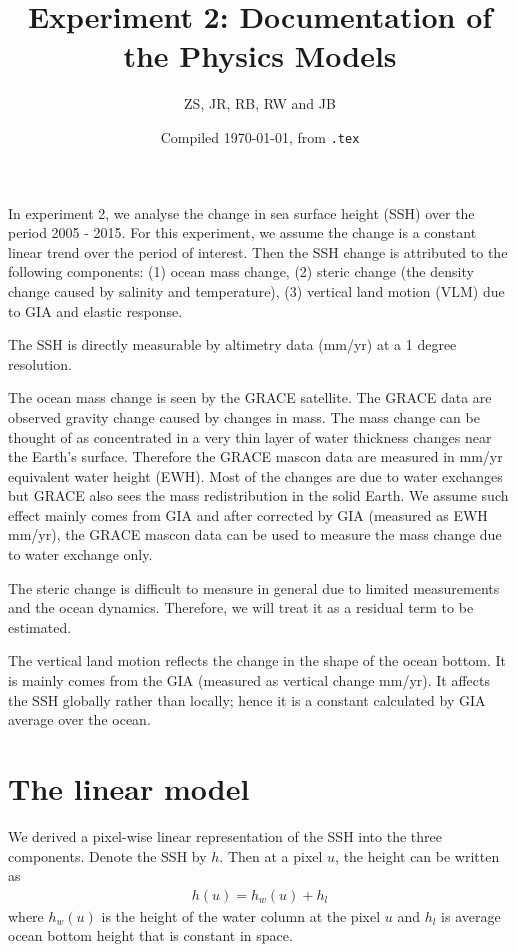 \documentclass[a4paper,12pt]{article}
\title{Experiment 2: Documentation of the Physics Models}
\author{ZS, JR, RB, RW and JB}
\date{Compiled \today, from \texttt{\jobname.tex}}
\begin{document}
\maketitle

In experiment 2, we analyse the change in sea surface height (SSH) over the period 2005 - 2015. For this experiment, we assume the change is a constant linear trend over the period of interest. Then the SSH change is attributed to the following components: (1) ocean mass change, (2) steric change (the density change caused by salinity and temperature), (3) vertical land motion (VLM) due to GIA and elastic response. 


The SSH is directly measurable by altimetry data (mm/yr) at a 1 degree resolution. 

The ocean mass change is seen by the GRACE satellite. The GRACE data are observed gravity change caused by changes in mass. The mass change can be thought of as  concentrated in a very thin layer of water thickness changes near the Earth's surface. Therefore the GRACE mascon data are measured in mm/yr equivalent water height (EWH). Most of the changes are due to water exchanges but GRACE also sees the mass redistribution in the solid Earth. We assume such effect mainly comes from GIA and after corrected by GIA (measured as EWH mm/yr), the GRACE mascon data can be used to measure the mass change due to water exchange only.

The steric change is difficult to measure in general due to limited measurements and the ocean dynamics. Therefore, we will treat it as a residual term to be estimated.

The vertical land motion reflects the change in the shape of the ocean bottom. It is mainly comes from the GIA (measured as vertical change mm/yr). It affects the SSH globally rather than locally; hence it is a constant calculated by GIA average over the ocean.


\section{The linear model}
We derived a pixel-wise linear representation of the SSH into the three components. 
Denote the SSH by $h$. Then at a pixel $u$, the height can be written as
\begin{align}
h(u) = h_w(u) + h_l
\end{align}
where $h_w(u)$ is the height of the water column at the pixel $u$ and $h_l$ is average ocean bottom height that is constant in space. 
\end{document}
